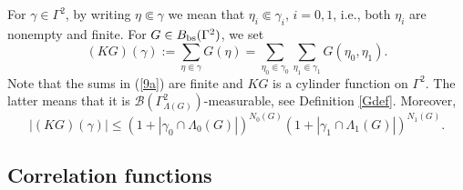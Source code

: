 \documentclass[reqno,11pt]{amsart}
\theoremstyle{definition}
\theoremstyle{remark}
\numberwithin{equation}{section}
\begin{document}
For $\gamma\in \Gamma^2$, by writing $\eta \Subset \gamma$ we mean
that $\eta_i\Subset \gamma_i$, $i=0,1$, i.e., both $\eta_i$ are
nonempty and finite. For $G\in B_{\rm bs}(\Gamma^2)$, we set
\begin{equation}
  \label{9a}
(KG)(\gamma) := \sum_{\eta \Subset \gamma} G(\eta) = \sum_{\eta_0
\Subset \gamma_0} \sum_{\eta_1 \Subset \gamma_1} G(\eta_0,\eta_1).
\end{equation}
Note that the sums in (\ref{9a}) are finite and $KG$ is a cylinder
function on $\Gamma^2$. The latter means that it is
$\mathcal{B}(\Gamma^2_{\Lambda(G)})$-measurable, see Definition
\ref{Gdef}. Moreover,
\begin{equation}
  \label{9b}
|(KG)(\gamma)| \leq \left( 1 + |\gamma_0\cap\Lambda_0
(G)|\right)^{N_0(G)} \left( 1 + |\gamma_1\cap\Lambda_1
(G)|\right)^{N_1(G)}.
\end{equation}

\subsection{Correlation functions}
\end{document}
